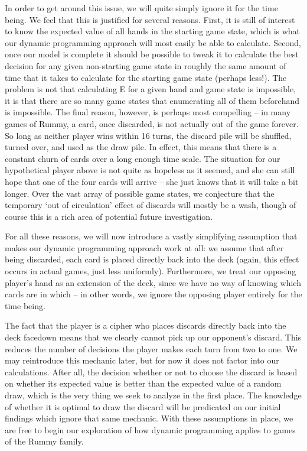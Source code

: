 \documentclass[letter,12pt]{article}
\begin{document}
In order to get around this issue, we will quite simply ignore it for the time being. We feel that this is justified for several reasons. First, it is still of interest to know the expected value of all hands in the starting game state, which is what our dynamic programming approach will most easily be able to calculate. Second, once our model is complete it should be possible to tweak it to calculate the best decision for any given non-starting game state in roughly the same amount of time that it takes to calculate for the starting game state (perhaps less!). The problem is not that calculating E for a given hand and game state is impossible, it is that there are so many game states that enumerating all of them beforehand is impossible. The final reason, however, is perhaps most compelling – in many games of Rummy, a card, once discarded, is not actually out of the game forever. So long as neither player wins within 16 turns, the discard pile will be shuffled, turned over, and used as the draw pile. In effect, this means that there is a constant churn of cards over a long enough time scale. The situation for our hypothetical player above is not quite as hopeless as it seemed, and she can still hope that one of the four cards will arrive – she just knows that it will take a bit longer. Over the vast array of possible game states, we conjecture that the temporary ‘out of circulation’ effect of discards will mostly be a wash, though of course this is a rich area of potential future investigation. 

For all these reasons, we will now introduce a vastly simplifying assumption that makes our dynamic programming approach work at all: we assume that after being discarded, each card is placed directly back into the deck (again, this effect occurs in actual games, just less uniformly). Furthermore, we treat our opposing player’s hand as an extension of the deck, since we have no way of knowing which cards are in which – in other words, we ignore the opposing player entirely for the time being.  

The fact that the player is a cipher who places discards directly back into the deck facedown means that we clearly cannot pick up our opponent’s discard. This reduces the number of decisions the player makes each turn from two to one. We may reintroduce this mechanic later, but for now it does not factor into our calculations. After all, the decision whether or not to choose the discard is based on whether its expected value is better than the expected value of a random draw, which is the very thing we seek to analyze in the first place. The knowledge of whether it is optimal to draw the discard will be predicated on our initial findings which ignore that same mechanic. With these assumptions in place, we are free to begin our exploration of how dynamic programming applies to games of the Rummy family.
\end{document}
